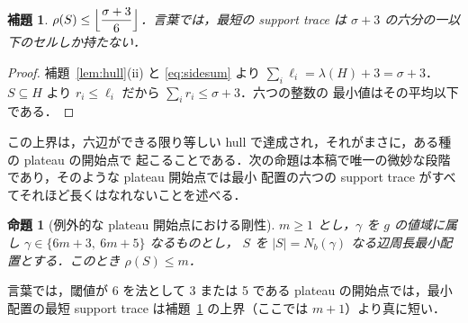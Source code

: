 \documentclass[11pt]{article}
\theoremstyle{plain}
\newtheorem{lemma}[theorem]{補題}
\newtheorem{proposition}[theorem]{命題}
\theoremstyle{definition}
\theoremstyle{remark}
\begin{document}
\begin{lemma}\label{lem:rhobound}
\(\displaystyle \rho(S)\le\Bigl\lfloor\frac{\sigma+3}{6}\Bigr\rfloor\)．言葉では，最短の
support trace は \(\sigma+3\) の六分の一以下のセルしか持たない．
\end{lemma}

\begin{proof}
補題~\ref{lem:hull}(ii) と \eqref{eq:sidesum} より \(\sum_{i}\ell_{i}=\lambda(H)+3=\sigma+3\)．
\(S\subseteq H\) より \(r_{i}\le\ell_{i}\) だから \(\sum_{i}r_{i}\le\sigma+3\)．六つの整数の
最小値はその平均以下である．
\end{proof}

この上界は，六辺ができる限り等しい hull で達成され，それがまさに，ある種の plateau の開始点で
起こることである．次の命題は本稿で唯一の微妙な段階であり，そのような plateau 開始点では最小
配置の六つの support trace がすべてそれほど長くはなれないことを述べる．

\begin{proposition}[例外的な plateau 開始点における剛性]\label{pro:rigidity}
\(m\ge1\) とし，\(\gamma\) を \(g\) の値域に属し \(\gamma\in\{6m+3,\ 6m+5\}\) なるものとし，
\(S\) を \(|S|=N_{b}(\gamma)\) なる辺周長最小配置とする．このとき \(\rho(S)\le m\)．
\end{proposition}

言葉では，閾値が 6 を法として 3 または 5 である plateau の開始点では，最小配置の最短
support trace は補題~\ref{lem:rhobound} の上界（ここでは \(m+1\)）より真に短い．
\end{document}
